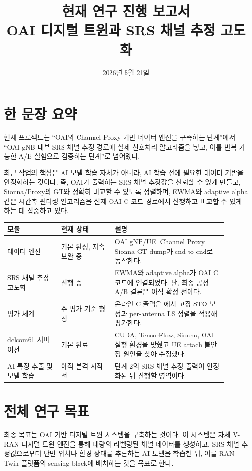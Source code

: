 \documentclass[11pt,a4paper]{article}
\title{\textbf{현재 연구 진행 보고서}\\
\large OAI 디지털 트윈과 SRS 채널 추정 고도화}
\author{}
\date{2026년 5월 21일}
\newcommand{\code}[1]{\texttt{\detokenize{#1}}}
\begin{document}
\maketitle

\tableofcontents
\newpage

\section{한 문장 요약}

현재 프로젝트는 ``OAI와 Channel Proxy 기반 데이터 엔진을 구축하는 단계''에서 ``OAI gNB 내부 SRS 채널 추정 경로에 실제 신호처리 알고리즘을 넣고, 이를 반복 가능한 A/B 실험으로 검증하는 단계''로 넘어왔다.

최근 작업의 핵심은 AI 모델 학습 자체가 아니라, AI 학습 전에 필요한 데이터 기반을 안정화하는 것이다. 즉, OAI가 출력하는 SRS 채널 추정값을 신뢰할 수 있게 만들고, Sionna/Proxy의 GT와 정확히 비교할 수 있도록 정렬하며, EWMA와 adaptive alpha 같은 시간축 필터링 알고리즘을 실제 OAI C 코드 경로에서 실행하고 비교할 수 있게 하는 데 집중하고 있다.

\begin{longtable}{p{0.22\linewidth} p{0.22\linewidth} p{0.46\linewidth}}
\toprule
\textbf{모듈} & \textbf{현재 상태} & \textbf{설명} \\
\midrule
데이터 엔진 & 기본 완성, 지속 보완 중 & OAI gNB/UE, Channel Proxy, Sionna GT dump가 end-to-end로 동작한다. \\
SRS 채널 추정 고도화 & 진행 중 & EWMA와 adaptive alpha가 OAI C 코드에 연결되었다. 단, 최종 공정 A/B 결론은 아직 확정 전이다. \\
평가 체계 & 주 평가 기준 형성 & 온라인 C 출력은 \code{eval_pdpR_nmse.py}에서 고정 STO 보정과 per-antenna LS 정렬을 적용해 평가한다. \\
dclcom61 서버 이전 & 기본 완료 & CUDA, TensorFlow, Sionna, OAI 실행 환경을 맞췄고 UE attach 불안정 원인을 찾아 수정했다. \\
AI 특징 추출 및 모델 학습 & 아직 본격 시작 전 & 단계 2의 SRS 채널 추정 출력이 안정화된 뒤 진행할 영역이다. \\
\bottomrule
\end{longtable}

\section{전체 연구 목표}

최종 목표는 OAI 기반 디지털 트윈 시스템을 구축하는 것이다. 이 시스템은 자체 V-RAN 디지털 트윈 엔진을 통해 대량의 라벨링된 채널 데이터를 생성하고, SRS 채널 추정값으로부터 단말 위치나 환경 상태를 추론하는 AI 모델을 학습한 뒤, 이를 RAN Twin 플랫폼의 sensing block에 배치하는 것을 목표로 한다.
\end{document}
